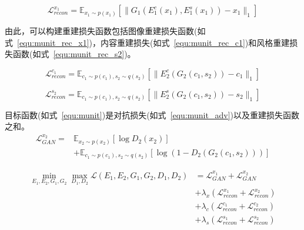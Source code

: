 \begin{equation}
\label{equ:munit_rec_x1}
\mathcal{L}_{recon}^{x_1} = \mathbb{E}_{x_1 \sim p(x_1)}[\parallel G_1(E_1^c(x_1),E_1^s(x_1))-x_1\parallel_1]
\end{equation}


由此，可以构建重建损失函数包括图像重建损失函数(如式~\ref{equ:munit_rec_x1})，内容重建损失(如式~\ref{equ:munit_rec_c1})和风格重建损失函数(如式~\ref{equ:munit_rec_s2})。

\begin{equation}
\label{equ:munit_rec_c1}
\mathcal{L}_{recon}^{c_1} = \mathbb{E}_{c_1 \sim p(c_1), s_2 \sim q(s_2)}[\parallel E_2^c(G_2(c_1,s_2))-c_1\parallel_1]
\end{equation}



\begin{equation}
\label{equ:munit_rec_s2}
\mathcal{L}_{recon}^{s_2} = \mathbb{E}_{c_1 \sim p(c_1), s_2 \sim q(s_2)}[\parallel E_2^s(G_2(c_1,s_2))-s_2\parallel_1]
\end{equation}

目标函数(如式~\ref{equ:munit})是对抗损失(如式~\ref{equ:munit_adv})以及重建损失函数之和。
\begin{equation}
\label{equ:munit_adv}
\begin{aligned}
\mathcal{L}_{GAN}^{x_2} = & \mathbb{E}_{x_2 \sim p(x_2)}[\log D_2(x_2)] \\
& +\mathbb{E}_{c_1 \sim p(c_1), s_2 \sim q(s_2)}[\log(1-D_2(G_2(c_1,s_2)))]
\end{aligned}
\end{equation}

\begin{equation}
\label{equ:munit}
\begin{aligned}
\min \limits_{E_1,E_2,G_1,G_2} \max \limits_{D_1,D_2} \mathcal{L}(E_1,E_2,G_1,G_2,D_1,D_2) & = \mathcal{L}_{GAN}^{x_1}+\mathcal{L}_{GAN}^{x_2} \\
& +\lambda_x(\mathcal{L}_{recon}^{x_1}+\mathcal{L}_{recon}^{x_2}) \\
& + \lambda_c(\mathcal{L}_{recon}^{c_1}+\mathcal{L}_{recon}^{c_2}) \\
& +\lambda_s(\mathcal{L}_{recon}^{s_1}+\mathcal{L}_{recon}^{s_2})
\end{aligned}
\end{equation}


